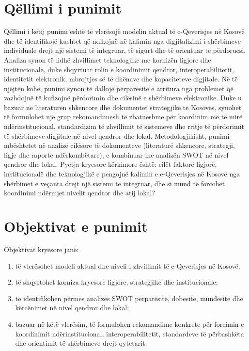 \documentclass[conference]{IEEEtran}
\begin{document}
\section{Qëllimi i punimit}
Qëllimi i këtij punimi është të vlerësojë modelin aktual të e-Qeverisjes në Kosovë dhe të identifikojë kushtet që ndikojnë në kalimin nga digjitalizimi i shërbimeve individuale drejt një sistemi të integruar, të sigurt dhe të orientuar te përdoruesi. Analiza synon të lidhë zhvillimet teknologjike me kornizën ligjore dhe institucionale, duke shqyrtuar rolin e koordinimit qendror, interoperabilitetit, identitetit elektronik, mbrojtjes së të dhënave dhe kapaciteteve digjitale. Në të njëjtën kohë, punimi synon të dallojë përparësitë e arritura nga problemet që vazhdojnë të kufizojnë përdorimin dhe cilësinë e shërbimeve elektronike. Duke u bazuar në literaturën shkencore dhe dokumentet strategjike të Kosovës, synohet të formulohet një grup rekomandimesh të zbatueshme për koordinim më të mirë ndërinstitucional, standardizim të zhvillimit të sistemeve dhe rritje të përdorimit të shërbimeve digjitale në nivel qendror dhe lokal. Metodologjikisht, punimi mbështetet në analizë cilësore të dokumenteve (literaturë shkencore, strategji, ligje dhe raporte ndërkombëtare), e kombinuar me analizën SWOT në nivel qendror dhe lokal. Pyetja kryesore kërkimore është: cilët faktorë ligjorë, institucionalë dhe teknologjikë e pengojnë kalimin e e-Qeverisjes në Kosovë nga shërbimet e veçanta drejt një sistemi të integruar, dhe si mund të forcohet koordinimi ndërmjet nivelit qendror dhe atij lokal?
\section{Objektivat e punimit}
Objektivat kryesore janë:
\begin{enumerate}
\renewcommand{\labelenumi}{(\arabic{enumi})}
\item të vlerësohet modeli aktual dhe niveli i zhvillimit të e-Qeverisjes në Kosovë;
\item të shqyrtohet korniza kryesore ligjore, strategjike dhe institucionale;
\item të identifikohen përmes analizës SWOT përparësitë, dobësitë, mundësitë dhe kërcënimet në nivel qendror dhe lokal;
\item bazuar në këtë vlerësim, të formulohen rekomandime konkrete për forcimin e koordinimit ndërinstitucional, interoperabilitetit, standardeve të përbashkëta dhe orientimit të shërbimeve drejt qytetarit.
\end{enumerate}
\end{document}
